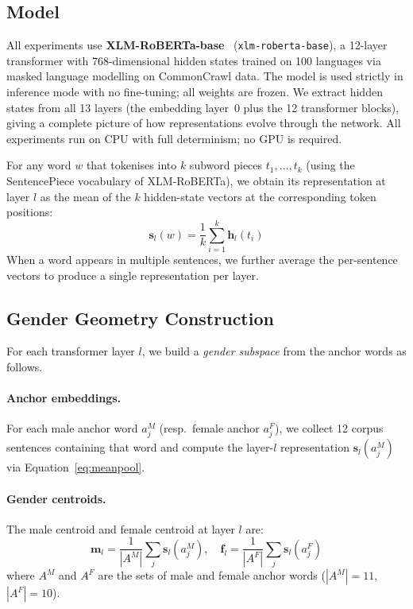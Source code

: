 \subsection{Model}

All experiments use \textbf{XLM-RoBERTa-base}~\cite{conneau2020unsupervised}
(\texttt{xlm-roberta-base}), a 12-layer transformer with 768-dimensional hidden
states trained on 100 languages via masked language modelling on CommonCrawl
data. The model is used strictly in inference mode with no fine-tuning; all
weights are frozen. We extract hidden states from all 13 layers (the embedding
layer~0 plus the 12 transformer blocks), giving a complete picture of how
representations evolve through the network. All experiments run on CPU with
full determinism; no GPU is required.

For any word $w$ that tokenises into $k$ subword pieces
$t_1, \ldots, t_k$ (using the SentencePiece vocabulary of XLM-RoBERTa), we
obtain its representation at layer $l$ as the mean of the $k$ hidden-state
vectors at the corresponding token positions:
\begin{equation}
  \mathbf{s}_l(w) = \frac{1}{k} \sum_{i=1}^{k} \mathbf{h}_l(t_i)
  \label{eq:meanpool}
\end{equation}
When a word appears in multiple sentences, we further average the per-sentence
vectors to produce a single representation per layer.

\subsection{Gender Geometry Construction}

For each transformer layer $l$, we build a \emph{gender subspace} from the
anchor words as follows.

\paragraph{Anchor embeddings.}
For each male anchor word $a^M_j$ (resp.\ female anchor $a^F_j$), we collect
12 corpus sentences containing that word and compute the layer-$l$
representation $\mathbf{s}_l(a^M_j)$ via Equation~\ref{eq:meanpool}.

\paragraph{Gender centroids.}
The male centroid and female centroid at layer $l$ are:
\begin{equation}
  \mathbf{m}_l = \frac{1}{|A^M|} \sum_{j} \mathbf{s}_l(a^M_j), \quad
  \mathbf{f}_l = \frac{1}{|A^F|} \sum_{j} \mathbf{s}_l(a^F_j)
\end{equation}
where $A^M$ and $A^F$ are the sets of male and female anchor words
($|A^M|=11$, $|A^F|=10$).

